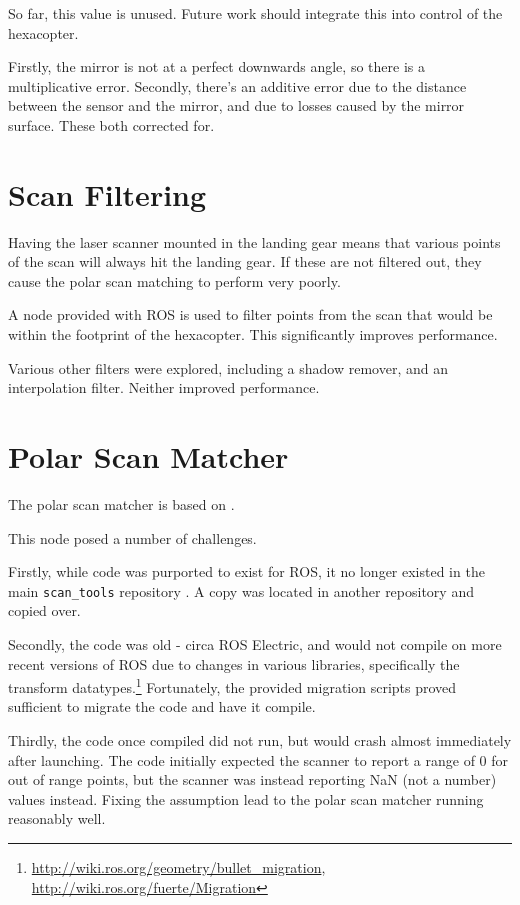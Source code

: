 \documentclass[12pt,oneside,a4paper]{book}
\begin{document}
So far, this value is unused. Future work should integrate this into
control of the hexacopter.

 Firstly, the mirror is not at a perfect downwards
angle, so there is a multiplicative error. Secondly, there's an
additive error due to the distance between the sensor and the mirror,
and due to losses caused by the mirror surface. These 
both corrected for.

\section{Scan Filtering}
\label{sec:scan-filtering}

Having the laser scanner mounted in the landing gear means that
various points of the scan will always hit the landing gear. If these
are not filtered out, they cause the polar scan matching to perform
very poorly.

A node provided with ROS is used to filter points from the scan that
would be within the footprint of the hexacopter. This significantly
improves performance.

Various other filters were explored, including a shadow remover, and
an interpolation filter. Neither improved performance.

\section{Polar Scan Matcher}
\label{sec:polar-scan-matcher}

The polar scan matcher is based on .

This node posed a number of challenges.

Firstly, while code was purported to exist for ROS, it no longer
existed in the main \texttt{scan\_tools} repository . A copy was located in another repository and copied
over.

Secondly, the code was old - circa ROS Electric, and would not compile on more recent
versions of ROS due to changes in various libraries, specifically the
transform datatypes.\footnote{
  \url{http://wiki.ros.org/geometry/bullet_migration},
  \url{http://wiki.ros.org/fuerte/Migration}} Fortunately, the
provided migration scripts proved sufficient to migrate the code and
have it compile.

Thirdly, the code once compiled did not run, but would crash almost
immediately after launching. The code initially expected the scanner
to report a range of 0 for out of range points, but the scanner was
instead reporting NaN (not a number) values instead. Fixing the
assumption lead to the polar scan matcher running reasonably well.
\end{document}
